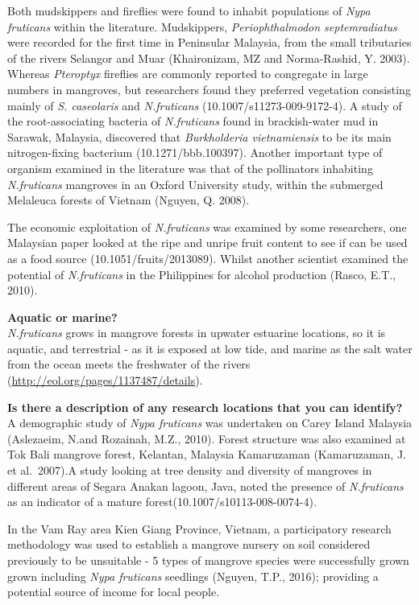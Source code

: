\documentclass[]{book}
\theoremstyle{definition}
\theoremstyle{definition}
\theoremstyle{definition}
\theoremstyle{remark}
\begin{document}
Both mudskippers and fireflies were found to inhabit populations of
\emph{Nypa fruticans} within the literature. Mudskippers,
\emph{Periophthalmodon septemradiatus} were recorded for the first time
in Peninsular Malaysia, from the small tributaries of the rivers
Selangor and Muar (Khaironizam, MZ and Norma-Rashid, Y. 2003). Whereas
\emph{Pteroptyx} fireflies are commonly reported to congregate in large
numbers in mangroves, but researchers found they preferred vegetation
consisting mainly of \emph{S. caseolaris} and \emph{N.fruticans}
(10.1007/s11273-009-9172-4). A study of the root-associating bacteria of
\emph{N.fruticans} found in brackish-water mud in Sarawak, Malaysia,
discovered that \emph{Burkholderia vietnamiensis} to be its main
nitrogen-fixing bacterium (10.1271/bbb.100397). Another important type
of organism examined in the literature was that of the pollinators
inhabiting \emph{N.fruticans} mangroves in an Oxford University study,
within the submerged Melaleuca forests of Vietnam (Nguyen, Q. 2008).

The economic exploitation of \emph{N.fruticans} was examined by some
researchers, one Malaysian paper looked at the ripe and unripe fruit
content to see if can be used as a food source (10.1051/fruits/2013089).
Whilst another scientist examined the potential of \emph{N.fruticans} in
the Philippines for alcohol production (Rasco, E.T., 2010).

\textbf{Aquatic or marine?}\\
\emph{N.fruticans} grows in mangrove forests in upwater estuarine
locations, so it is aquatic, and terrestrial - as it is exposed at low
tide, and marine as the salt water from the ocean meets the freshwater
of the rivers (\url{http://eol.org/pages/1137487/details}).

\textbf{Is there a description of any research locations that you can
identify?}\\
A demographic study of \emph{Nypa fruticans} was undertaken on Carey
Island Malaysia (Aslezaeim, N.and Rozainah, M.Z., 2010). Forest
structure was also examined at Tok Bali mangrove forest, Kelantan,
Malaysia Kamaruzaman (Kamaruzaman, J. et al.~2007).A study looking at
tree density and diversity of mangroves in different areas of Segara
Anakan lagoon, Java, noted the presence of \emph{N.fruticans} as an
indicator of a mature forest(10.1007/s10113-008-0074-4).

In the Vam Ray area Kien Giang Province, Vietnam, a participatory
research methodology was used to establish a mangrove nursery on soil
considered previously to be unsuitable - 5 types of mangrove species
were successfully grown grown including \emph{Nypa fruticans} seedlings
(Nguyen, T.P., 2016); providing a potential source of income for local
people.
\end{document}
